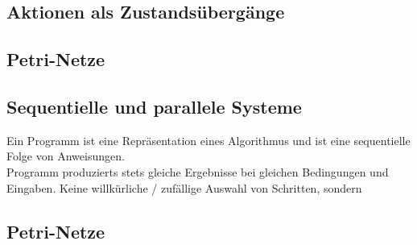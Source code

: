 \subsection{Aktionen als Zustandsübergänge}

\subsection{Petri-Netze}

\subsection{Sequentielle und parallele Systeme}
Ein Programm ist eine Repräsentation eines Algorithmus und ist eine sequentielle Folge von Anweisungen. \\
 Programm produzierts stets gleiche Ergebnisse bei gleichen Bedingungen und Eingaben.  Keine willkürliche / zufällige Auswahl von Schritten, sondern 

\subsection{Petri-Netze}



